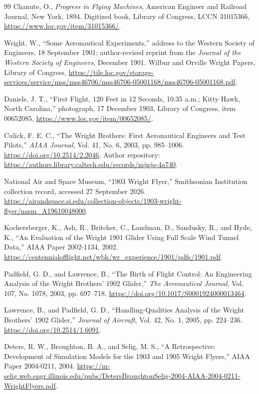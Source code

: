 \documentclass[11pt,a4paper]{article}
\begin{document}
\begingroup\raggedright
\begin{thebibliography}{99}
 Chanute, O., \emph{Progress in Flying Machines}, American Engineer and Railroad Journal, New York, 1894. Digitized book, Library of Congress, LCCN 31015366, \url{https://www.loc.gov/item/31015366/}.

 Wright, W., ``Some Aeronautical Experiments,'' address to the Western Society of Engineers, 18 September 1901; author-revised reprint from the \emph{Journal of the Western Society of Engineers}, December 1901. Wilbur and Orville Wright Papers, Library of Congress, \url{https://tile.loc.gov/storage-services/service/mss/mss46706/mss46706-05001168/mss46706-05001168.pdf}.

 Daniels, J. T., ``First Flight, 120 Feet in 12 Seconds, 10:35 a.m.; Kitty Hawk, North Carolina,'' photograph, 17 December 1903, Library of Congress, item 00652085, \url{https://www.loc.gov/item/00652085/}.

 Culick, F. E. C., ``The Wright Brothers: First Aeronautical Engineers and Test Pilots,'' \emph{AIAA Journal}, Vol. 41, No. 6, 2003, pp. 985--1006. \url{https://doi.org/10.2514/2.2046}. Author repository: \url{https://authors.library.caltech.edu/records/mjnjq-4a740}.

 National Air and Space Museum, ``1903 Wright Flyer,'' Smithsonian Institution collection record, accessed 27 September 2026. \url{https://airandspace.si.edu/collection-objects/1903-wright-flyer/nasm_A19610048000}.

 Kochersberger, K., Ash, R., Britcher, C., Landman, D., Sandusky, R., and Hyde, K., ``An Evaluation of the Wright 1901 Glider Using Full Scale Wind Tunnel Data,'' AIAA Paper 2002-1134, 2002. \url{https://centennialofflight.net/wbh/wr_experience/1901/pdfs/1901.pdf}.

 Padfield, G. D., and Lawrence, B., ``The Birth of Flight Control: An Engineering Analysis of the Wright Brothers' 1902 Glider,'' \emph{The Aeronautical Journal}, Vol. 107, No. 1078, 2003, pp. 697--718. \url{https://doi.org/10.1017/S0001924000013464}.

 Lawrence, B., and Padfield, G. D., ``Handling-Qualities Analysis of the Wright Brothers' 1902 Glider,'' \emph{Journal of Aircraft}, Vol. 42, No. 1, 2005, pp. 224--236. \url{https://doi.org/10.2514/1.6091}.

 Deters, R. W., Broughton, B. A., and Selig, M. S., ``A Retrospective: Development of Simulation Models for the 1903 and 1905 Wright Flyers,'' AIAA Paper 2004-0211, 2004. \url{https://m-selig.web.engr.illinois.edu/pubs/DetersBroughtonSelig-2004-AIAA-2004-0211-WrightFlyers.pdf}.


\end{thebibliography}
\end{document}
